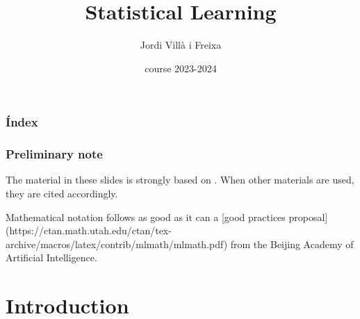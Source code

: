 \documentclass{beamer}
\title[Sttatistical Learning]{Statistical Learning} %
\author{Jordi Villà i Freixa} %
\institute[FCTE] %
{
Universitat de Vic - Universitat Central de Catalunya \\
Study Abroad\\ %
\medskip
\textit{jordi.villa@uvic.cat} %
}
\date{course 2023-2024}
\begin{document}
\begin{frame}
\titlepage %
\end{frame}

\begin{frame}
\frametitle{Índex} %
\tableofcontents %
\end{frame}


\begin{frame}
  \frametitle{Preliminary note}
  The material in these slides is strongly based on \cite{kroese2020}. When other materials are used, they are cited accordingly.

  Mathematical notation follows as good as it can a [good practices proposal](https://ctan.math.utah.edu/ctan/tex-archive/macros/latex/contrib/mlmath/mlmath.pdf) from the Beijing Academy of Artificial Intelligence.
  \end{frame}

\section{Introduction} %

\end{document}
